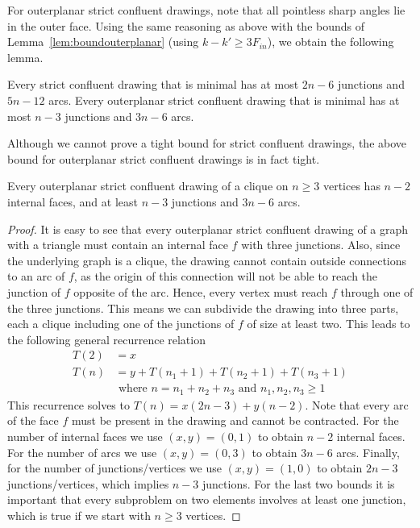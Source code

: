 \documentclass{llncs}
\begin{document}
For outerplanar strict confluent drawings, note that all pointless sharp angles lie in the outer face. Using the same reasoning as above with the bounds of Lemma~\ref{lem:boundouterplanar} (using $k - k' \geq 3F_{in}$), we obtain the following lemma.
\begin{lemma}\label{lem:boundminimal}
Every strict confluent drawing that is minimal has at most $2n - 6$ junctions and $5n - 12$ arcs. Every outerplanar strict confluent drawing that is minimal has at most $n - 3$ junctions and $3n - 6$ arcs.
\end{lemma}
Although we cannot prove a tight bound for strict confluent drawings, the above bound for outerplanar strict confluent drawings is in fact tight.
\begin{lemma}
Every outerplanar strict confluent drawing of a clique on $n \geq 3$ vertices has $n-2$ internal faces, and at least $n - 3$ junctions and $3n - 6$ arcs.
\end{lemma}
\begin{proof}
It is easy to see that every outerplanar strict confluent drawing of a graph with a triangle must contain an internal face $f$ with three junctions. Also, since the underlying graph is a clique, the drawing cannot contain outside connections to an arc of $f$, as the origin of this connection will not be able to reach the junction of $f$ opposite of the arc. Hence, every vertex must reach $f$ through one of the three junctions. This means we can subdivide the drawing into three parts, each a clique including one of the junctions of $f$ of size at least two. This leads to the following general recurrence relation
\begin{align*}
T(2) &= x\\
T(n) &= y + T(n_1 + 1) + T(n_2 + 1) + T(n_3 + 1)\\
&\text{ where } n = n_1 + n_2 + n_3 \text{ and } n_1,n_2,n_3 \geq 1
\end{align*}
This recurrence solves to $T(n) = x (2n - 3) + y (n-2)$. Note that every arc of the face $f$ must be present in the drawing and cannot be contracted. For the number of internal faces we use $(x,y)=(0,1)$ to obtain $n-2$ internal faces. For the number of arcs we use $(x,y)=(0,3)$ to obtain $3n - 6$ arcs. Finally, for the number of junctions/vertices we use $(x,y)=(1,0)$ to obtain $2n - 3$ junctions/vertices, which implies $n - 3$ junctions. For the last two bounds it is important that every subproblem on two elements involves at least one junction, which is true if we start with $n \geq 3$ vertices.
\end{proof}
\end{document}
